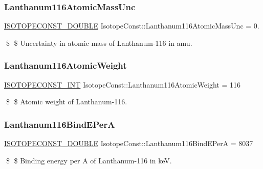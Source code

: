 \subsubsection{\texorpdfstring{Lanthanum116\+Atomic\+Mass\+Unc}{Lanthanum116AtomicMassUnc}}
{\footnotesize\ttfamily \mbox{\hyperlink{group___isotope_const-_macros_ga8f45a7272ce02c0b4c65c44636ed719a}{I\+S\+O\+T\+O\+P\+E\+C\+O\+N\+S\+T\+\_\+\+D\+O\+U\+B\+LE}} Isotope\+Const\+::\+Lanthanum116\+Atomic\+Mass\+Unc = 0.}

\$ \$ Uncertainty in atomic mass of Lanthanum-\/116 in amu. \mbox{\label{group___isotope_const-_lanthanum-_la116_ga44c812c879220c0748f1ee4df870e855}} 
\subsubsection{\texorpdfstring{Lanthanum116\+Atomic\+Weight}{Lanthanum116AtomicWeight}}
{\footnotesize\ttfamily \mbox{\hyperlink{group___isotope_const-_macros_ga5f18360b3e99483a35c32d789e62621c}{I\+S\+O\+T\+O\+P\+E\+C\+O\+N\+S\+T\+\_\+\+I\+NT}} Isotope\+Const\+::\+Lanthanum116\+Atomic\+Weight = 116}

\$ \$ Atomic weight of Lanthanum-\/116. \mbox{\label{group___isotope_const-_lanthanum-_la116_gab36f7b8110d1063ceb18d44c9d58425a}} 
\subsubsection{\texorpdfstring{Lanthanum116\+Bind\+E\+PerA}{Lanthanum116BindEPerA}}
{\footnotesize\ttfamily \mbox{\hyperlink{group___isotope_const-_macros_ga8f45a7272ce02c0b4c65c44636ed719a}{I\+S\+O\+T\+O\+P\+E\+C\+O\+N\+S\+T\+\_\+\+D\+O\+U\+B\+LE}} Isotope\+Const\+::\+Lanthanum116\+Bind\+E\+PerA = 8037}

\$ \$ Binding energy per A of Lanthanum-\/116 in keV. \mbox{\label{group___isotope_const-_lanthanum-_la116_gae2bcf3ee234708aa81572b7caa7ad5fb}} 
